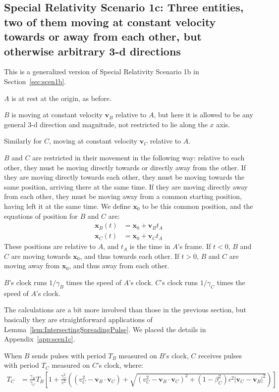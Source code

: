 \documentclass[a4paper]{article}
\theoremstyle{plain}
\theoremstyle{definition}
\newcommand{\vect}[1]{\mathbf{#1}}
\begin{document}
\subsection{Special Relativity Scenario 1c: Three entities, two of them moving at constant velocity towards or away from each other, but otherwise arbitrary 3-d directions}
\label{sec:scen1c}

This is a generalized version of Special Relativity Scenario 1b in
Section~\ref{sec:scen1b}.

$A$ is at rest at the origin, as before.

$B$ is moving at constant velocity $\vect{v}_B$ relative to $A$, but
here it is allowed to be any general 3-d direction and magnitude, not
restricted to lie along the $x$ axis.

Similarly for $C$, moving at constant velocity $\vect{v}_C$ relative
to $A$.

$B$ and $C$ are restricted in their movement in the following way:
relative to each other, they must be moving directly towards or
directly away from the other.  If they are moving directly towards
each other, they must be moving towards the same position, arriving
there at the same time.  If they are moving directly away from each
other, they must be moving away from a common starting position,
having left it at the same time.  We define $\vect{x}_0$ to be this
common position, and the equations of position for $B$ and $C$ are:
\begin{align}
\vect{x}_B(t) & = \vect{x}_0 + \vect{v}_B t_A \label{eqn:scen1c-Bpos} \\
\vect{x}_C(t) & = \vect{x}_0 + \vect{v}_C t_A \label{eqn:scen1c-Cpos}
\end{align}
These positions are relative to $A$, and $t_A$ is the time in $A$'s
frame.  If $t < 0$, $B$ and $C$ are moving towards $\vect{x}_0$, and
thus towards each other.  If $t > 0$, $B$ and $C$ are moving away from
$\vect{x}_0$, and thus away from each other.

$B$'s clock runs $1/\gamma_B$ times the speed of $A$'s clock.
$C$'s clock runs $1/\gamma_C$ times the speed of $A$'s clock.

The calculations are a bit more involved than those in the previous
section, but basically they are straightforward applications of
Lemma~\ref{lem:IntersectingSpreadingPulse}.  We placed the details in
Appendix~\ref{app:scen1c}.

When $B$ sends pulses with period $T_B$ measured on $B$'s clock, $C$
receives pulses with period $T_C$ measured on $C$'s clock, where:
\begin{align}
T_C
  & = \frac{\gamma_B}{\gamma_C} T_B \left[ 1 + \frac{\gamma_C^2}{c^2} \left( (v_C^2 - \vect{v}_B \cdot \vect{v}_C) + \sqrt{(v_C^2 - \vect{v}_B \cdot \vect{v}_C)^2  + (1-\beta_C^2)c^2 |\vect{v}_C - \vect{v}_B|^2} \right) \right] \label{eqn:scen1c-TC}
\end{align}
\end{document}
